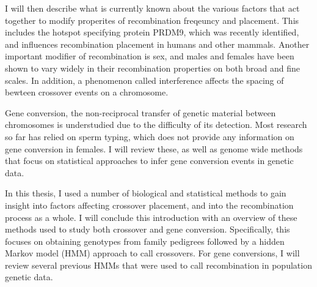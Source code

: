 I will then describe what is currently known about the various factors that act together to modify properites of recombination freqeuncy and placement.
This includes the hotspot specifying protein PRDM9, which was recently identified, and influences recombination placement in humans and other mammals.
Another important modifier of recombination is sex, and males and females have been shown to vary widely in their recombination properties on both broad and fine scales.
In addition, a phenomenon called interference affects the spacing of bewteen crossover events on a chromosome.


Gene conversion, the non-reciprocal transfer of genetic material between chromosomes is understudied due to the difficulty of its detection.
Most research so far has relied on sperm typing, which does not provide any information on gene conversion in females.
I will review these, as well as genome wide methods that focus on statistical approaches to infer gene conversion events in genetic data.

In this thesis, I used a number of biological and statistical methods to gain insight into factors affecting crossover placement, and into the recombination process as a whole.
I will conclude this introduction with an overview of these methods used to study both crossover and gene conversion.
Specifically, this focuses on obtaining genotypes from family pedigrees followed by a hidden Markov model (HMM) approach to call crossovers.
For gene conversions, I will review several previous HMMs that were used to call recombination in population genetic data.

